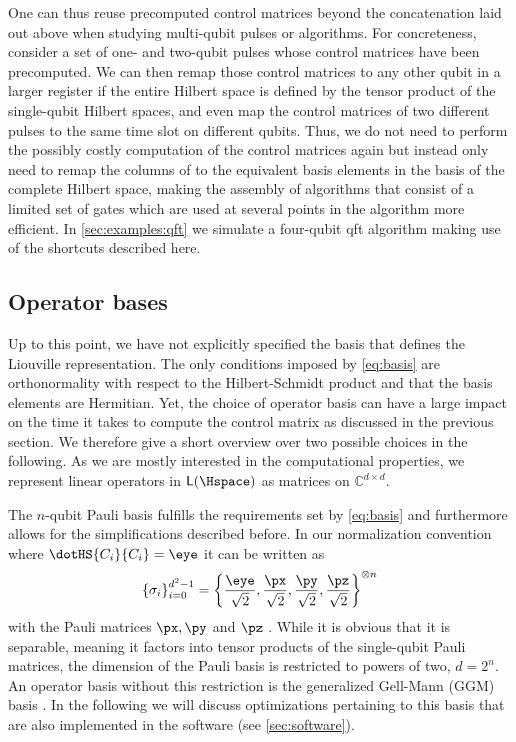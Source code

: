 One can thus reuse precomputed control matrices beyond the concatenation laid out above when studying multi-qubit pulses or algorithms. For concreteness, consider a set of one- and two-qubit pulses whose control matrices have been precomputed. We can then remap those control matrices to any other qubit in a larger register if the entire Hilbert space is defined by the tensor product of the single-qubit Hilbert spaces, and even map the control matrices of two different pulses to the same time slot on different qubits. Thus, we do not need to perform the possibly costly computation of the control matrices again but instead only need to remap the columns of \ctrlmat to the equivalent basis elements in the basis of the complete Hilbert space, making the assembly of algorithms that consist of a limited set of gates which are used at several points in the algorithm more efficient. In \cref{sec:examples:qft} we simulate a four-qubit \gls{qft} algorithm making use of the shortcuts described here.

\subsection{Operator bases}\label{sec:performance:basis}
Up to this point, we have not explicitly specified the basis that defines the Liouville representation. The only conditions imposed by \cref{eq:basis} are orthonormality with respect to the Hilbert-Schmidt product and that the basis elements are Hermitian. Yet, the choice of operator basis can have a large impact on the time it takes to compute the control matrix as discussed in the previous section. We therefore give a short overview over two possible choices in the following. As we are mostly interested in the computational properties, we represent linear operators in $\mathsf{L}(\Hspace)$ as matrices on $\mathbb{C}^{d\times d}$.

The $n$-qubit Pauli basis fulfills the requirements set by \cref{eq:basis} and furthermore allows for the simplifications described before. In our normalization convention where $\dotHS{C_i}{C_i} = \eye$ it can be written as
\begin{equation}\label{eq:basis:pauli}
    \left\lbrace\sigma_i\right\rbrace_{i=0}^{d^2-1} = \left\lbrace
                                                          \frac{\eye}{\sqrt{2}},
                                                          \frac{\px}{\sqrt{2}},
                                                          \frac{\py}{\sqrt{2}},
                                                          \frac{\pz}{\sqrt{2}}
                                                      \right\rbrace^{\otimes n}
\end{equation}
with the Pauli matrices $\px,\py$ and $\pz$ . While it is obvious that it is separable, meaning it factors into tensor products of the single-qubit Pauli matrices, the dimension of the Pauli basis is restricted to powers of two, \ie $d = 2^n$. An operator basis without this restriction is the generalized Gell-Mann (GGM) basis \cite{Kimura2003,Bertlmann2008}. In the following we will discuss optimizations pertaining to this basis that are also implemented in the software (see \cref{sec:software}).

